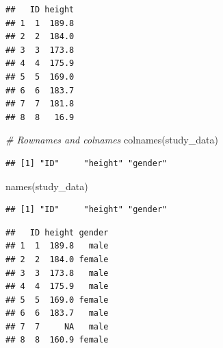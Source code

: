 \documentclass[
]{book}
\newenvironment{Shaded}{\begin{snugshade}}{\end{snugshade}}
\newcommand{\CommentTok}[1]{\textcolor[rgb]{0.56,0.35,0.01}{\textit{#1}}}
\newcommand{\ConstantTok}[1]{\textcolor[rgb]{0.00,0.00,0.00}{#1}}
\newcommand{\DecValTok}[1]{\textcolor[rgb]{0.00,0.00,0.81}{#1}}
\newcommand{\FloatTok}[1]{\textcolor[rgb]{0.00,0.00,0.81}{#1}}
\newcommand{\FunctionTok}[1]{\textcolor[rgb]{0.00,0.00,0.00}{#1}}
\newcommand{\NormalTok}[1]{#1}
\newcommand{\OtherTok}[1]{\textcolor[rgb]{0.56,0.35,0.01}{#1}}
\newcommand{\SpecialCharTok}[1]{\textcolor[rgb]{0.00,0.00,0.00}{#1}}
\begin{document}
\begin{verbatim}
##   ID height
## 1  1  189.8
## 2  2  184.0
## 3  3  173.8
## 4  4  175.9
## 5  5  169.0
## 6  6  183.7
## 7  7  181.8
## 8  8   16.9
\end{verbatim}

\begin{Shaded}
\begin{Highlighting}[]
\CommentTok{\# Rownames and colnames}
\FunctionTok{colnames}\NormalTok{(study\_data)}
\end{Highlighting}
\end{Shaded}

\begin{verbatim}
## [1] "ID"     "height" "gender"
\end{verbatim}

\begin{Shaded}
\begin{Highlighting}[]
\FunctionTok{names}\NormalTok{(study\_data)}
\end{Highlighting}
\end{Shaded}

\begin{verbatim}
## [1] "ID"     "height" "gender"
\end{verbatim}

\begin{Shaded}
\end{Shaded}

\begin{verbatim}
##   ID height gender
## 1  1  189.8   male
## 2  2  184.0 female
## 3  3  173.8   male
## 4  4  175.9   male
## 5  5  169.0 female
## 6  6  183.7   male
## 7  7     NA   male
## 8  8  160.9 female
\end{verbatim}

\begin{Shaded}
\end{Shaded}
\end{document}
